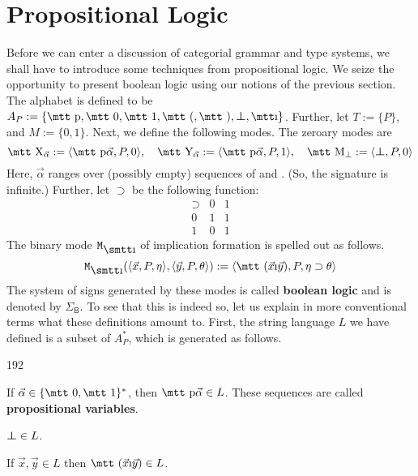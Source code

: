 \newcommand{\strictif}{\supset}
\section{Propositional Logic}
\label{kap:prop}
%
%
%
Before we can enter a discussion of categorial grammar and type
systems, we shall have to introduce some techniques from
propositional logic. We seize the opportunity to present boolean
logic using our notions of the previous section. The alphabet is
defined to be $A_P := \{\mbox{\mtt p}, \mbox{\mtt 0}, \mbox{\mtt 1},
\mbox{\mtt (}, \mbox{\mtt )}, \sbot, \mbox{\mtt\symbol{25}}\}$. 
Further, let $T := \{P\}$, and $M := \{0,1\}$. Next, we define 
the following modes. The zeroary modes are
\begin{equation}
\mbox{\mtt X}_{\vec{\alpha}} := \auf \mbox{\mtt p}\vec{\alpha},
    P, 0\zu, \quad 
\mbox{\mtt Y}_{\vec{\alpha}} := \auf \mbox{\mtt p}\vec{\alpha},
    P, 1\zu, \quad 
\mbox{\mtt M}_{\bot} := \auf \sbot, P, 0\zu 
\end{equation}
Here, $\vec{\alpha}$ ranges over (possibly empty) sequences of
{} and {}. (So, the signature is infinite.) Further, 
let $\strictif$ be the following function:
\begin{equation}
\begin{array}{l|ll}
\strictif & 0 & 1 \\\hline
0       & 1 & 1 \\
1       & 0 & 1
\end{array}
\end{equation}
The binary mode $\mbox{\tt M}_{\mbox{\smtt\symbol{25}}}$ of implication 
formation is spelled out as follows.
\begin{equation}
\mbox{\tt M}_{\mbox{\smtt\symbol{25}}}(\auf \vec{x}, P, \eta\zu,
    \auf \vec{y}, P, \theta\zu)
:= 
    \auf \mbox{\mtt ($\vec{x}$\symbol{25}$\vec{y}$)}, P,
    \eta \strictif \theta\zu
\end{equation}
The system of signs generated by these modes is called
\textbf{boolean logic}
and is denoted by $\Sigma_{\mathsf{B}}$. To see that this is
indeed so, let us explain in more conventional terms what these
definitions amount to. First, the string language $L$ we have
defined is a subset of $A_P^{\ast}$, which is generated as follows.
\begin{dingautolist}{192}
\item If $\vec{\alpha} \in \{\mbox{\mtt 0}, \mbox{\mtt 1}\}^{\ast}$,
    then $\mbox{\mtt p}\vec{\alpha} \in L$. These sequences are
    called \textbf{propositional variables}.
\item $\boldsymbol{\bot}\in L$.
\item If $\vec{x}, \vec{y}\in L$ then $\mbox{\mtt ($\vec{x}$\symbol{25}$%
\vec{y}$)}\in L$.
\end{dingautolist}
